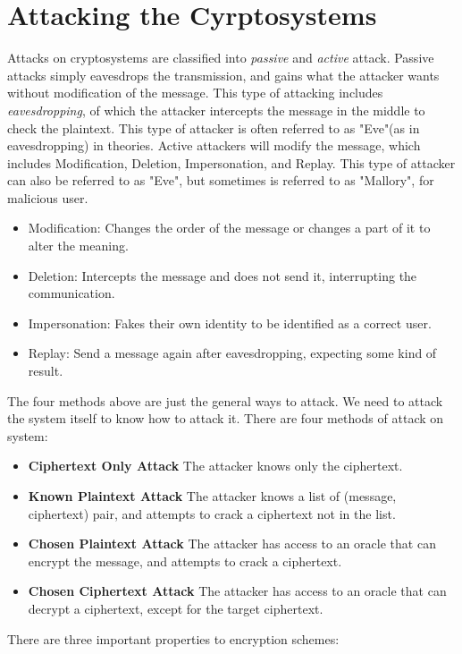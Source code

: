 \documentclass{report}
\begin{document}
	\section{Attacking the Cyrptosystems}
		Attacks on cryptosystems are classified into \emph{passive} and \emph{active} attack.
		Passive attacks simply eavesdrops the transmission, and gains what the attacker wants without modification of the message. This type of attacking includes \emph{eavesdropping}, of which the attacker intercepts the message in the middle to check the plaintext. This type of attacker is often referred to as "Eve"(as in eavesdropping) in theories.
		Active attackers will modify the message, which includes Modification, Deletion, Impersonation, and Replay. This type of attacker can also be referred to as "Eve", but sometimes is referred to as "Mallory", for malicious user.
		\begin{itemize}
			\item Modification: Changes the order of the message or changes a part of it to alter the meaning.
			\item Deletion: Intercepts the message and does not send it, interrupting the communication.
			\item Impersonation: Fakes their own identity to be identified as a correct user.
			\item Replay: Send a message again after eavesdropping, expecting some kind of result.
		\end{itemize}
		The four methods above are just the general ways to attack. We need to attack the system itself to know how to attack it. There are four methods of attack on system:
		\begin{itemize}
			\item \textbf{Ciphertext Only Attack}
			\subitem The attacker knows only the ciphertext.
			\item \textbf{Known Plaintext Attack}
			\subitem The attacker knows a list of (message, ciphertext) pair, and attempts to crack a ciphertext not in the list.
			\item \textbf{Chosen Plaintext Attack}
			\subitem The attacker has access to an oracle that can encrypt the message, and attempts to crack a ciphertext.
			\item \textbf{Chosen Ciphertext Attack}
			\subitem The attacker has access to an oracle that can decrypt a ciphertext, except for the target ciphertext.
		\end{itemize}
		There are three important properties to encryption schemes:
\end{document}
